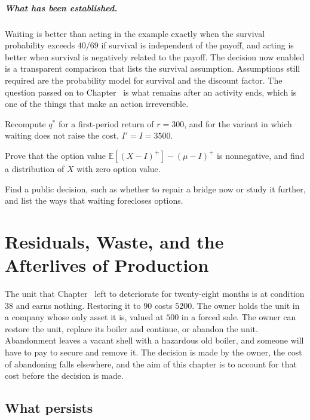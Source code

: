 \paragraph{What has been established.} Waiting is better than acting in the example exactly when the survival probability exceeds $40/69$ if survival is independent of the payoff, and acting is better when survival is negatively related to the payoff. The decision now enabled is a transparent comparison that lists the survival assumption. Assumptions still required are the probability model for survival and the discount factor. The question passed on to Chapter~ is what remains after an activity ends, which is one of the things that make an action irreversible.

\begin{exercise}
Recompute $q^*$ for a first-period return of $r=300$, and for the variant in which waiting does not raise the cost, $I'=I=3500$.
\end{exercise}
\begin{exercise}
Prove that the option value $\mathbb E[(X-I)^+]-(\mu-I)^+$ is nonnegative, and find a distribution of $X$ with zero option value.
\end{exercise}
\begin{exercise}
Find a public decision, such as whether to repair a bridge now or study it further, and list the ways that waiting forecloses options.
\end{exercise}

\chapter{Residuals, Waste, and the Afterlives of Production}\label{ch:10}

The unit that Chapter~ left to deteriorate for twenty-eight months is at condition $38$ and earns nothing. Restoring it to $90$ costs $5200$. The owner holds the unit in a company whose only asset it is, valued at $500$ in a forced sale. The owner can restore the unit, replace its boiler and continue, or abandon the unit. Abandonment leaves a vacant shell with a hazardous old boiler, and someone will have to pay to secure and remove it. The decision is made by the owner, the cost of abandoning falls elsewhere, and the aim of this chapter is to account for that cost before the decision is made.

\section{What persists}

